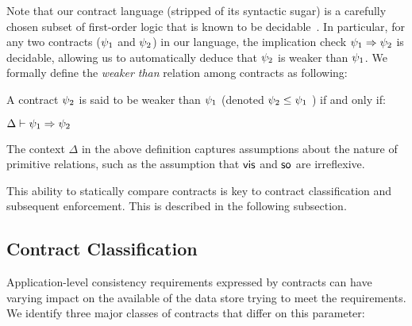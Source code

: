 Note that our contract language (stripped of its syntactic sugar) is a
carefully chosen subset of first-order logic that is known to be
decidable~\cite{epr}. In particular, for any two contracts ($\psi_1$
and $\psi_2$) in our language, the implication check $\psi_1 \Rightarrow
\psi_2$ is decidable, allowing us to automatically deduce that $\psi_2$
is weaker than $\psi_1$. We formally define the \emph{weaker than}
relation among contracts as following: 
\begin{definition}
A contract $\psi_2$ is said to be weaker than $\psi_1$ (denoted $\psi_2
\le \psi_1$ ) if and only if:
\begin{center}
$\Delta \vdash \psi_1 \Rightarrow \psi_2$
\end{center}
\end{definition}
\noindent The context $\Delta$ in the above definition captures assumptions
about the nature of primitive relations, such as the assumption that
${\normalfont \textsf{vis}}$ and ${\normalfont \textsf{so}}$ are irreflexive.

This ability to statically compare contracts is key to contract
classification and subsequent enforcement. This is described in the
following subsection.

\subsection{Contract Classification}

Application-level consistency requirements expressed by \name
contracts can have varying impact on the available of the data store
trying to meet the requirements. We identify three major classes of
contracts that differ on this parameter: 

